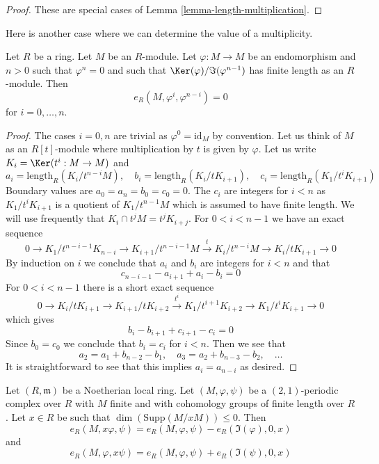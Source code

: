 \begin{proof}
These are special cases of Lemma \ref{lemma-length-multiplication}.
\end{proof}

\noindent
Here is another case where we can determine the value of a multiplicity.

\begin{lemma}
\label{lemma-powers-period-length-zero}
Let $R$ be a ring. Let $M$ be an $R$-module.
Let $\varphi : M \to M$ be an endomorphism and $n > 0$
such that $\varphi^n = 0$ and such that $\Ker(\varphi)/\Im(\varphi^{n - 1})$
has finite length as an $R$-module.
Then
$$
e_R(M, \varphi^i, \varphi^{n - i}) = 0
$$
for $i = 0, \ldots, n$.
\end{lemma}

\begin{proof}
The cases $i = 0, n$ are trivial as $\varphi^0 = \text{id}_M$ by convention.
Let us think of $M$ as an $R[t]$-module where multiplication by $t$
is given by $\varphi$. Let us write
$K_i = \Ker(t^i : M \to M)$ and
$$
a_i = \text{length}_R(K_i/t^{n - i}M),\quad
b_i = \text{length}_R(K_i/tK_{i + 1}),\quad
c_i = \text{length}_R(K_1/t^iK_{i + 1})
$$
Boundary values are $a_0 = a_n = b_0 = c_0 = 0$.
The $c_i$ are integers for $i < n$ as $K_1/t^iK_{i + 1}$
is a quotient of $K_1/t^{n - 1}M$ which is assumed to have finite length.
We will use frequently that $K_i \cap t^jM = t^jK_{i + j}$.
For $0 < i < n - 1$ we have an exact sequence
$$
0 \to
K_1/t^{n - i - 1}K_{n - i} \to
K_{i + 1}/t^{n - i - 1}M \xrightarrow{t} K_i/t^{n - i}M
\to K_i/tK_{i + 1} \to 0
$$
By induction on $i$ we conclude that $a_i$ and $b_i$ are
integers for $i < n$ and that
$$
c_{n - i - 1} - a_{i + 1} + a_i - b_i = 0
$$
For $0 < i < n - 1$ there is a short exact sequence
$$
0 \to
K_i/tK_{i + 1} \to
K_{i + 1}/tK_{i + 2} \xrightarrow{t^i}
K_1/t^{i + 1}K_{i + 2} \to
K_1/t^iK_{i + 1} \to 0
$$
which gives
$$
b_i - b_{i + 1} + c_{i + 1} - c_i = 0
$$
Since $b_0 = c_0$ we conclude that $b_i = c_i$ for $i < n$.
Then we see that
$$
a_2 = a_1 + b_{n - 2} - b_1,\quad
a_3 = a_2 + b_{n - 3} - b_2,\quad \ldots
$$
It is straightforward to see that this implies $a_i = a_{n - i}$ as desired.
\end{proof}

\begin{lemma}
\label{lemma-multiply-period-length}
Let $(R, \mathfrak m)$ be a Noetherian local ring. Let
$(M, \varphi, \psi)$ be a $(2, 1)$-periodic complex over $R$
with $M$ finite and with cohomology groups of finite length over $R$.
Let $x \in R$ be such that $\dim(\text{Supp}(M/xM)) \leq 0$. Then
$$
e_R(M, x\varphi, \psi) = e_R(M, \varphi, \psi) - e_R(\Im(\varphi), 0, x)
$$
and
$$
e_R(M, \varphi, x\psi) = e_R(M, \varphi, \psi) + e_R(\Im(\psi), 0, x)
$$
\end{lemma}

